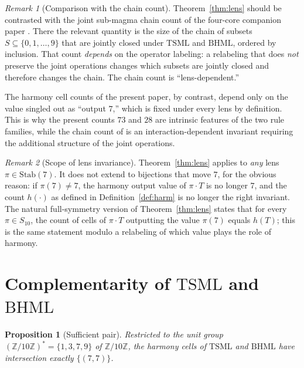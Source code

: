 \documentclass[11pt,reqno]{amsart}
\theoremstyle{plain}
\newtheorem{proposition}[theorem]{Proposition}
\theoremstyle{definition}
\theoremstyle{remark}
\newtheorem*{remark}{Remark}
\newcommand{\Z}{\mathbb{Z}}
\newcommand{\Zten}{\Z/10\Z}
\newcommand{\TSML}{\mathrm{TSML}}
\newcommand{\BHML}{\mathrm{BHML}}
\begin{document}
\begin{remark}[Comparison with the chain count]\label{rem:chain}
Theorem~\ref{thm:lens} should be contrasted with the joint
sub-magma chain count of the four-core companion paper
\cite{J02}. There the relevant quantity is the size of the chain
of subsets $S \subseteq \{0, 1, \ldots, 9\}$ that are jointly
closed under $\TSML$ and $\BHML$, ordered by inclusion. That count
\emph{depends} on the operator labeling: a relabeling that does
\emph{not} preserve the joint operations changes which subsets are
jointly closed and therefore changes the chain. The chain count is
``lens-dependent.''

The harmony cell counts of the present paper, by contrast, depend
only on the value singled out as ``output $7$,'' which is fixed
under every lens by definition. This is why the present counts
$73$ and $28$ are intrinsic features of the two rule families,
while the chain count of \cite{J02} is an interaction-dependent
invariant requiring the additional structure of the joint
operations.
\end{remark}

\begin{remark}[Scope of lens invariance]\label{rem:scope}
Theorem~\ref{thm:lens} applies to \emph{any} lens
$\pi \in \mathrm{Stab}(7)$. It does not extend to bijections that
move $7$, for the obvious reason: if $\pi(7) \ne 7$, the harmony
output value of $\pi \cdot T$ is no longer $7$, and the count
$h(\cdot)$ as defined in Definition~\ref{def:harm} is no longer
the right invariant. The natural full-symmetry version of
Theorem~\ref{thm:lens} states that for every $\pi \in S_{10}$,
the count of cells of $\pi \cdot T$ outputting the value $\pi(7)$
equals $h(T)$; this is the same statement modulo a relabeling of
which value plays the role of harmony.
\end{remark}

\section{Complementarity of $\TSML$ and $\BHML$}\label{sec:comp}

\begin{proposition}[Sufficient pair]\label{prop:complement}
Restricted to the unit group $(\Zten)^* = \{1, 3, 7, 9\}$ of
$\Zten$, the harmony cells of $\TSML$ and $\BHML$ have intersection
exactly $\{(7, 7)\}$.
\end{proposition}
\end{document}
